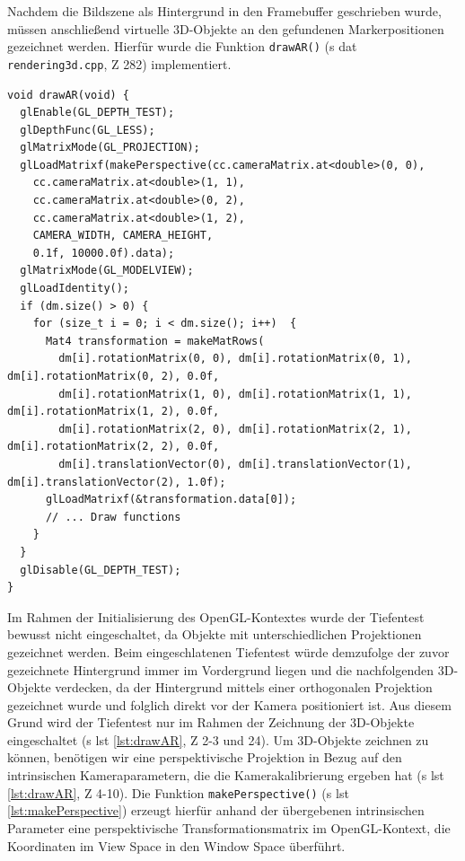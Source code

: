 Nachdem die Bildszene als Hintergrund in den Framebuffer geschrieben wurde, müssen anschließend virtuelle 3D-Objekte an den gefundenen Markerpositionen gezeichnet werden. Hierfür wurde die Funktion \texttt{drawAR()} (\acs{s} \acs{dat} \texttt{rendering3d.cpp}, \acs{Z} 282) implementiert.

\newpage

\begin{lstlisting}[caption={Die Funktion \texttt{rendering3d.cpp/drawAR()} zeichnet über gefundenen Markern 3D-Objekte}, label={lst:drawAR}]
void drawAR(void) {
  glEnable(GL_DEPTH_TEST);
  glDepthFunc(GL_LESS);
  glMatrixMode(GL_PROJECTION);
  glLoadMatrixf(makePerspective(cc.cameraMatrix.at<double>(0, 0),
    cc.cameraMatrix.at<double>(1, 1),
    cc.cameraMatrix.at<double>(0, 2),
    cc.cameraMatrix.at<double>(1, 2),
    CAMERA_WIDTH, CAMERA_HEIGHT,
    0.1f, 10000.0f).data);
  glMatrixMode(GL_MODELVIEW);
  glLoadIdentity();
  if (dm.size() > 0) {
    for (size_t i = 0; i < dm.size(); i++)  {
      Mat4 transformation = makeMatRows(
        dm[i].rotationMatrix(0, 0), dm[i].rotationMatrix(0, 1), dm[i].rotationMatrix(0, 2), 0.0f,
        dm[i].rotationMatrix(1, 0), dm[i].rotationMatrix(1, 1), dm[i].rotationMatrix(1, 2), 0.0f,
        dm[i].rotationMatrix(2, 0), dm[i].rotationMatrix(2, 1), dm[i].rotationMatrix(2, 2), 0.0f,
        dm[i].translationVector(0), dm[i].translationVector(1), dm[i].translationVector(2), 1.0f);
      glLoadMatrixf(&transformation.data[0]);
      // ... Draw functions
    }
  }
  glDisable(GL_DEPTH_TEST);
}
\end{lstlisting}

\noindent Im Rahmen der Initialisierung des OpenGL-Kontextes wurde der Tiefentest bewusst nicht eingeschaltet, da Objekte mit unterschiedlichen Projektionen gezeichnet werden. Beim eingeschlatenen Tiefentest würde demzufolge der zuvor gezeichnete Hintergrund immer im Vordergrund liegen und die nachfolgenden 3D-Objekte verdecken, da der Hintergrund mittels einer orthogonalen Projektion gezeichnet wurde und folglich direkt vor der Kamera positioniert ist. Aus diesem Grund wird der Tiefentest nur im Rahmen der Zeichnung der 3D-Objekte eingeschaltet (\acs{s} \acs{lst} \ref{lst:drawAR}, \acs{Z} 2-3 und 24). Um 3D-Objekte zeichnen zu können, benötigen wir eine perspektivische Projektion in Bezug auf den intrinsischen Kameraparametern, die die Kamerakalibrierung ergeben hat (\acs{s} \acs{lst} \ref{lst:drawAR}, \acs{Z} 4-10). Die Funktion \texttt{makePerspective()} (\acs{s} \acs{lst} \ref{lst:makePerspective}) erzeugt hierfür anhand der übergebenen intrinsischen Parameter eine perspektivische Transformationsmatrix im OpenGL-Kontext, die Koordinaten im View Space in den Window Space überführt.

